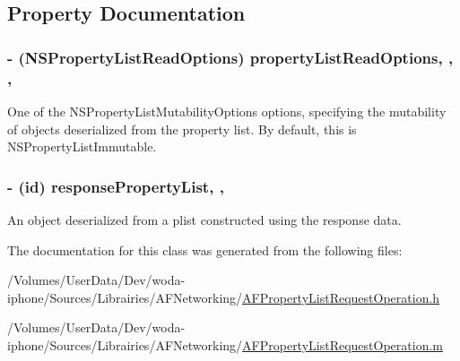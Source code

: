 \subsection{Property Documentation}
\hypertarget{interface_a_f_property_list_request_operation_a5fb606d19d4b174a207a695132f97f59}{
\subsubsection[{property\-List\-Read\-Options}]{\setlength{\rightskip}{0pt plus 5cm}-\/ (N\-S\-Property\-List\-Read\-Options) property\-List\-Read\-Options\hspace{0.3cm}{\ttfamily [read]}, {\ttfamily [write]}, {\ttfamily [nonatomic]}, {\ttfamily [assign]}}}\label{interface_a_f_property_list_request_operation_a5fb606d19d4b174a207a695132f97f59}
One of the {\ttfamily N\-S\-Property\-List\-Mutability\-Options} options, specifying the mutability of objects deserialized from the property list. By default, this is {\ttfamily N\-S\-Property\-List\-Immutable}. \hypertarget{interface_a_f_property_list_request_operation_aa58eb95915eb6912569d6b3a97d5ee97}{
\subsubsection[{response\-Property\-List}]{\setlength{\rightskip}{0pt plus 5cm}-\/ (id) response\-Property\-List\hspace{0.3cm}{\ttfamily [read]}, {\ttfamily [nonatomic]}, {\ttfamily [assign]}}}\label{interface_a_f_property_list_request_operation_aa58eb95915eb6912569d6b3a97d5ee97}
An object deserialized from a plist constructed using the response data. 

The documentation for this class was generated from the following files\-:\begin{DoxyCompactItemize}
\item 
/\-Volumes/\-User\-Data/\-Dev/woda-\/iphone/\-Sources/\-Librairies/\-A\-F\-Networking/\hyperlink{_a_f_property_list_request_operation_8h}{A\-F\-Property\-List\-Request\-Operation.\-h}\item 
/\-Volumes/\-User\-Data/\-Dev/woda-\/iphone/\-Sources/\-Librairies/\-A\-F\-Networking/\hyperlink{_a_f_property_list_request_operation_8m}{A\-F\-Property\-List\-Request\-Operation.\-m}\end{DoxyCompactItemize}
